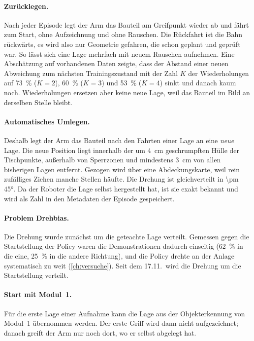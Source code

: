 \paragraph{Zurücklegen.} Nach jeder Episode legt der Arm das Bauteil am Greifpunkt wieder
ab und fährt zum Start, ohne Aufzeichnung und ohne Rauschen. Die Rückfahrt ist die Bahn
rückwärts, es wird also nur Geometrie gefahren, die schon geplant und geprüft war. So lässt
sich eine Lage mehrfach mit neuem Rauschen aufnehmen. Eine Abschätzung auf vorhandenen Daten
zeigte, dass der Abstand einer neuen Abweichung zum nächsten Trainingszustand mit der Zahl
$K$ der Wiederholungen auf \SI{73}{\percent} ($K=2$), \SI{60}{\percent} ($K=3$) und
\SI{53}{\percent} ($K=4$) sinkt und danach kaum noch. Wiederholungen ersetzen aber keine neue
Lage, weil das Bauteil im Bild an derselben Stelle bleibt.

\paragraph{Automatisches Umlegen.} Deshalb legt der Arm das Bauteil nach den Fahrten einer
Lage an eine \emph{neue} Lage. Die neue Position liegt innerhalb der um \SI{4}{\centi\metre}
geschrumpften Hülle der Tischpunkte, außerhalb von Sperrzonen und mindestens
\SI{3}{\centi\metre} von allen bisherigen Lagen entfernt. Gezogen wird über eine
Abdeckungskarte, weil rein zufälliges Ziehen manche Stellen häufte. Die Drehung ist
gleichverteilt in \ang{\pm 45}. Da der Roboter die Lage selbst hergestellt hat, ist sie exakt
bekannt und wird als Zahl in den Metadaten der Episode gespeichert.

\paragraph{Problem Drehbias.} Die Drehung wurde zunächst um die geteachte Lage verteilt.
Gemessen gegen die Startstellung der Policy waren die Demonstrationen dadurch einseitig
(\SI{62}{\percent} in die eine, \SI{25}{\percent} in die andere Richtung), und die Policy drehte
an der Anlage systematisch zu weit (\cref{ch:versuche}). Seit dem 17.11.\ wird die Drehung um
die Startstellung verteilt.

\paragraph{Start mit Modul~1.} Für die erste Lage einer Aufnahme kann die Lage aus der
Objekterkennung von Modul~1 übernommen werden. Der erste Griff wird dann nicht aufgezeichnet;
danach greift der Arm nur noch dort, wo er selbst abgelegt hat.

